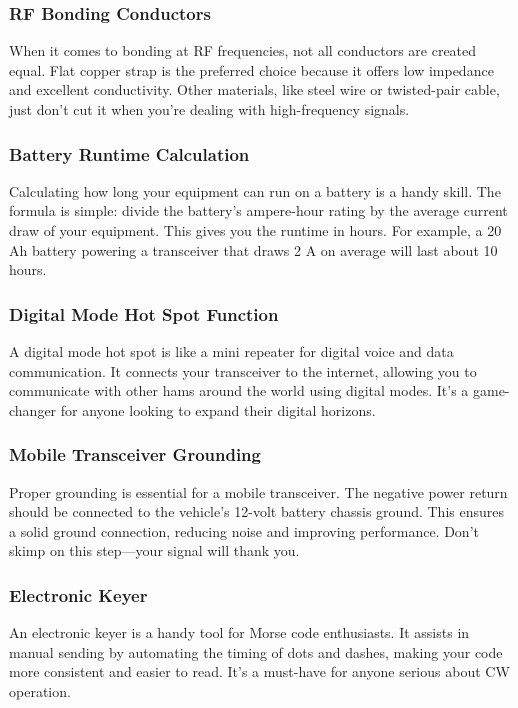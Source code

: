 \subsubsection*{RF Bonding Conductors}
When it comes to bonding at RF frequencies, not all conductors are created equal. Flat copper strap is the preferred choice because it offers low impedance and excellent conductivity. Other materials, like steel wire or twisted-pair cable, just don't cut it when you're dealing with high-frequency signals.

\subsubsection*{Battery Runtime Calculation}
Calculating how long your equipment can run on a battery is a handy skill. The formula is simple: divide the battery's ampere-hour rating by the average current draw of your equipment. This gives you the runtime in hours. For example, a 20 Ah battery powering a transceiver that draws 2 A on average will last about 10 hours.

\subsubsection*{Digital Mode Hot Spot Function}
A digital mode hot spot is like a mini repeater for digital voice and data communication. It connects your transceiver to the internet, allowing you to communicate with other hams around the world using digital modes. It's a game-changer for anyone looking to expand their digital horizons.

\subsubsection*{Mobile Transceiver Grounding}
Proper grounding is essential for a mobile transceiver. The negative power return should be connected to the vehicle's 12-volt battery chassis ground. This ensures a solid ground connection, reducing noise and improving performance. Don't skimp on this step—your signal will thank you.

\subsubsection*{Electronic Keyer}
An electronic keyer is a handy tool for Morse code enthusiasts. It assists in manual sending by automating the timing of dots and dashes, making your code more consistent and easier to read. It's a must-have for anyone serious about CW operation.



